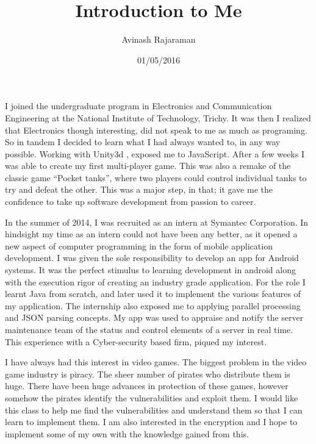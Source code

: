 \documentclass[11pt, pdftex]{article}
\title{Introduction to Me}
\author{Avinash Rajaraman}
\date{01/05/2016}
\begin{document}
\maketitle



I joined the undergraduate program in Electronics and Communication Engineering at the National Institute of Technology, Trichy. It was then I realized that Electronics though interesting, did not speak to me as much as  programing. So in tandem I decided to learn what I had always wanted to, in any way possible. Working with  Unity3d , exposed me to JavaScript. After a few weeks I was able to create my first multi-player game. This was also a remake of the classic game “Pocket tanks”, where two players could control individual tanks to try and defeat the other. This was a major step, in that; it gave me the confidence to take up software development from passion to career.

In the summer of 2014, I was recruited as an intern at Symantec Corporation. In hindsight my time as an intern could not have been any better, as it opened a new aspect of computer programming in the form of mobile application development. I was given the sole responsibility to develop an app for Android systems. It was the perfect stimulus to learning development in android along with the execution rigor of creating an industry grade application. For the role I learnt Java from scratch, and later used it to implement the various features of my application. The internship also exposed me to applying parallel processing and JSON parsing concepts. My app was used to appraise and notify the server maintenance team of the status and control elements of a server in real time. 
This experience with a Cyber-security based firm, piqued my interest.

I have always had this interest in video games. The biggest problem in the video game industry is piracy. The sheer number of pirates who distribute them is huge. There have been huge advances in protection of these games, however 
somehow the pirates identify the vulnerabilities and exploit them. I would like this class to help me find the vulnerabilities and understand them so that I can learn to implement them. I am also interested in the encryption and I hope to implement some of my own with the knowledge gained from this. 
\end{document}
